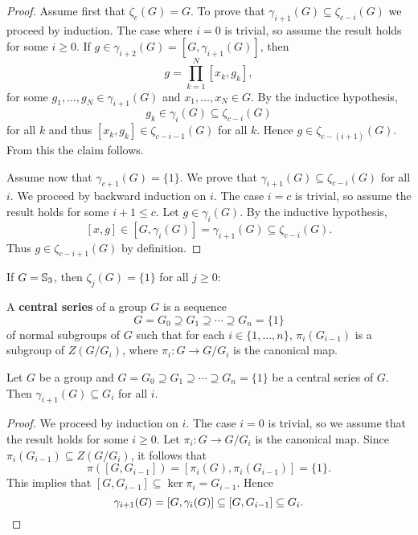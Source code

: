 \begin{proof}
	Assume first that $\zeta_c(G)=G$. To prove that 
    $\gamma_{i+1}(G)\subseteq\zeta_{c-i}(G)$ we proceed by induction. The case where $i=0$ is
	trivial, so assume the result holds for some $i\geq0$. If
	$g\in\gamma_{i+2}(G)=[G,\gamma_{i+1}(G)]$, then   
	\[
	g=\prod_{k=1}^N [x_k,g_k],
	\]
	for some $g_1,\dots,g_N\in\gamma_{i+1}(G)$ and $x_1,\dots,x_N\in G$. By the inductice hypothesis, 
	\[
	g_k\in\gamma_i(G)\subseteq\zeta_{c-i}(G)
	\]
	for all $k$ and thus $[x_k,g_k]\in\zeta_{c-i-1}(G)$ for all $k$. Hence 
	$g\in\zeta_{c-(i+1)}(G)$. From this the claim follows.
	
	Assume now that $\gamma_{c+1}(G)=\{1\}$. We prove that 
	$\gamma_{i+1}(G)\subseteq\zeta_{c-i}(G)$ for all $i$. We proceed by backward induction on $i$. 
	The case $i=c$ is trivial, so assume the
	result holds for some $i+1\leq c$. Let $g\in\gamma_{i}(G)$. By the inductive hypothesis, 
	\[
	[x,g]\in [G,\gamma_i(G)]=\gamma_{i+1}(G)\subseteq\zeta_{c-i}(G).
	\]
	Thus $g\in\zeta_{c-i+1}(G)$ by definition. 
\end{proof}

\begin{example}
	If $G=\mathbb{S}_3$, then $\zeta_j(G)=\{1\}$ for all $j\geq 0$: 
\end{example}

A \textbf{central series} of a group $G$ is a sequence
\[
	G=G_0\supseteq G_1\supseteq\cdots\supseteq G_n=\{1\}
\]
of normal subgroups of $G$ such that for each $i\in\{1,\dots,n\}$, 
$\pi_i(G_{i-1})$ is a subgroup of $Z(G/G_i)$, where $\pi_i\colon G\to
G/G_i$ is the canonical map. 

\begin{proposition}
	\label{pro:serie_central}
	Let $G$ be a group and $G=G_0\supseteq G_1\supseteq\cdots\supseteq G_n=\{1\}$
	be a central series of $G$. Then $\gamma_{i+1}(G)\subseteq G_i$ for all $i$.
\end{proposition}

\begin{proof}
	We proceed by induction on $i$. 
	The case $i=0$ is trivial, so we assume that 
	the result holds for some 
	$i\geq0$. 
	Let $\pi_i\colon G\to G/G_i$ is the canonical map. 
	Since $\pi_i(G_{i-1})\subseteq Z(G/G_{i})$, it follows that
	\[
	\pi([G,G_{i-1}])=[\pi_i(G),\pi_i(G_{i-1})]=\{1\}.
	\]
	This implies that $[G,G_{i-1}]\subseteq\ker\pi_i=G_{i-1}$. Hence
	\[
	\gamma_{i+1}(G)=[G,\gamma_i(G)]\subseteq [G,G_{i-1}]\subseteq G_i.\qedhere 
	\]
\end{proof}

